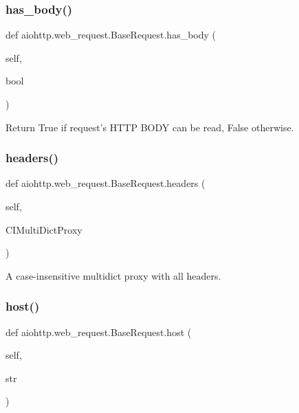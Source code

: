 \subsubsection{\texorpdfstring{has\+\_\+body()}{has\_body()}}
{\footnotesize\ttfamily def aiohttp.\+web\+\_\+request.\+Base\+Request.\+has\+\_\+body (\begin{DoxyParamCaption}\item[{}]{self,  }\item[{}]{bool }\end{DoxyParamCaption})}

\begin{DoxyVerb}Return True if request's HTTP BODY can be read, False otherwise.\end{DoxyVerb}
 \mbox{\label{classaiohttp_1_1web__request_1_1_base_request_a62c4d386acb7c94e7f85b50c2436469a}} 
\subsubsection{\texorpdfstring{headers()}{headers()}}
{\footnotesize\ttfamily def aiohttp.\+web\+\_\+request.\+Base\+Request.\+headers (\begin{DoxyParamCaption}\item[{}]{self,  }\item[{}]{C\+I\+Multi\+Dict\+Proxy }\end{DoxyParamCaption})}

\begin{DoxyVerb}A case-insensitive multidict proxy with all headers.\end{DoxyVerb}
 \mbox{\label{classaiohttp_1_1web__request_1_1_base_request_acc2beb36001bae7487e95bdff02a4b3e}} 
\subsubsection{\texorpdfstring{host()}{host()}}
{\footnotesize\ttfamily def aiohttp.\+web\+\_\+request.\+Base\+Request.\+host (\begin{DoxyParamCaption}\item[{}]{self,  }\item[{}]{str }\end{DoxyParamCaption})}

